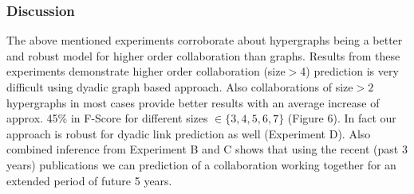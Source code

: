 \documentclass[twoside,leqno,twocolumn]{article}
\begin{document}

\subsubsection{Discussion}

The above mentioned experiments corroborate about hypergraphs being a better and robust model for higher order collaboration than graphs. Results from these experiments demonstrate higher order collaboration (size$>$4) prediction is very difficult using dyadic graph based approach. Also collaborations of size$>2$ hypergraphs in most cases provide better results with an average increase of approx. 45\% in F-Score for different sizes $\in \{3,4,5,6,7\}$ (Figure 6). In fact our approach is robust for dyadic link prediction as well (Experiment D). Also combined inference from Experiment B and C shows that using the recent (past 3 years) publications we can prediction of a collaboration working together for an extended period of future 5 years. 



%
\end{document}
